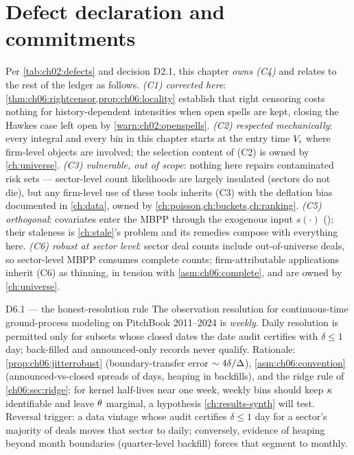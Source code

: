\section{Defect declaration and commitments}\label{ch06:sec:decisions}

Per \cref{tab:ch02:defects} and decision D2.1, this chapter \emph{owns
(C4)} and relates to the rest of the ledger as follows.
\emph{(C1) corrected here}: \cref{thm:ch06:rightcensor,prop:ch06:locality}
establish that right censoring costs nothing for history-dependent
intensities when open spells are kept, closing the Hawkes case left open by
\cref{warn:ch02:openspells}. \emph{(C2) respected mechanically}: every
integral and every bin in this chapter starts at the entry time
$V_i$ where firm-level objects are involved; the selection content of
(C2) is owned by \cref{ch:universe}. \emph{(C3) vulnerable, out of
scope}: nothing here repairs contaminated risk sets --- sector-level count
likelihoods are largely insulated (sectors do not die), but any firm-level
use of these tools inherits (C3) with the deflation bias documented in
\cref{ch:data}, owned by \cref{ch:poisson,ch:buckets,ch:ranking}.
\emph{(C5) orthogonal}: covariates enter the MBPP through the exogenous
input $s(\cdot)$ (); their staleness is
\cref{ch:stale}'s problem and its remedies compose with everything here.
\emph{(C6) robust at sector level}: sector deal counts include
out-of-universe deals, so sector-level MBPP consumes complete counts;
firm-attributable applications inherit (C6) as thinning, in tension with
\cref{asm:ch06:complete}, and are owned by \cref{ch:universe}.

\begin{decision}{D6.1 --- the honest-resolution rule}
The observation resolution for continuous-time ground-process modeling on
PitchBook 2011--2024 is \emph{weekly}. Daily resolution is permitted only
for subsets whose closed dates the date audit certifies with
$\delta \le 1$ day; back-filled and announced-only records never qualify.
Rationale: \cref{prop:ch06:jitterrobust} (boundary-transfer error
$\sim 4\delta/\Delta$), \cref{asm:ch06:convention} (announced-vs-closed
spreads of days, heaping in backfills), and the ridge rule of
\cref{ch06:sec:ridge}: for kernel half-lives near one week, weekly bins
should keep $\kappa$ identifiable and leave $\theta$ marginal, a
hypothesis \cref{ch:results-synth} will test. Reversal trigger: a
data vintage whose audit certifies $\delta \le 1$ day for a sector's
majority of deals moves that sector to daily; conversely, evidence of
heaping beyond month boundaries (quarter-level backfill) forces that
segment to monthly.
\end{decision}

